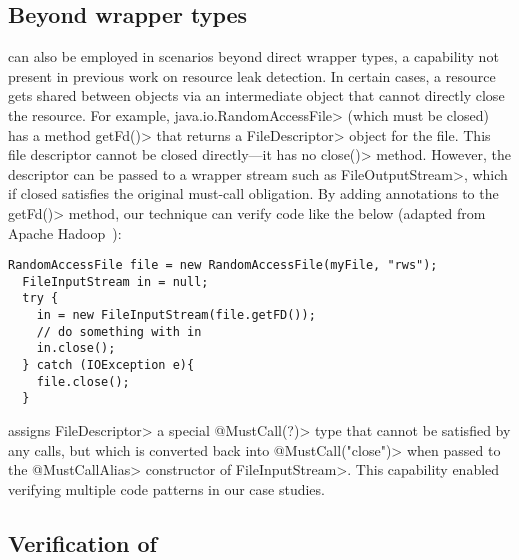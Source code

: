 
\subsection{Beyond wrapper types}

\MustCallAlias can also be employed in scenarios beyond direct wrapper types, a
capability not present in previous work on resource leak detection.  In certain cases, a resource gets
shared between objects via an intermediate object that cannot directly close the
resource.  For example, \<java.io.RandomAccessFile> (which must be closed) has
a method \<getFd()> that returns a \<FileDescriptor>
object for the file. This file
descriptor cannot be closed directly---it has no \<close()> method.
However, the descriptor can be passed to a wrapper stream such as
\<FileOutputStream>, which if closed satisfies the original must-call
obligation.  By adding \MustCallAlias annotations to the \<getFd()> method, our
technique can verify code like the below (adapted from Apache Hadoop~\cite{hadoop-random-access-file}):
\begin{lstlisting}[frame=tb,belowskip=3mm]
  RandomAccessFile file = new RandomAccessFile(myFile, "rws");
  FileInputStream in = null;
  try {
    in = new FileInputStream(file.getFD());
    // do something with in  
    in.close();
  } catch (IOException e){
    file.close();
  }
\end{lstlisting}
\Tool assigns \<FileDescriptor>
a special \<@MustCall(?)> type that cannot be satisfied by any calls,
but which is converted back into \<@MustCall("close")> when passed to the \<@MustCallAlias> constructor
of \<FileInputStream>. This capability enabled
verifying multiple code patterns in our case studies.

\subsection{Verification of \MustCallAlias}\label{sec:MustCallAlias-verification}

